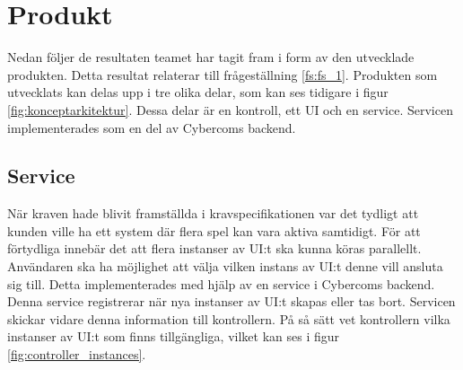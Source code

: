 \section{Produkt}
Nedan följer de resultaten teamet har tagit fram i form av den utvecklade produkten. Detta resultat relaterar till frågeställning \ref{fs:fs_1}. Produkten som utvecklats kan delas upp i tre olika delar, som kan ses tidigare i figur \ref{fig:konceptarkitektur}. Dessa delar är en kontroll, ett UI och en service. Servicen implementerades som en del av Cybercoms backend.

\subsection{Service}
När kraven hade blivit framställda i kravspecifikationen var det tydligt att kunden ville ha ett system där flera spel kan vara aktiva samtidigt. För att förtydliga innebär det att flera instanser av UI:t ska kunna köras parallellt. Användaren ska ha möjlighet att välja vilken instans av UI:t denne vill ansluta sig till. Detta implementerades med hjälp av en service i Cybercoms backend. Denna service registrerar när nya instanser av UI:t skapas eller tas bort. Servicen skickar vidare denna information till kontrollern. På så sätt vet kontrollern vilka instanser av UI:t som finns tillgängliga, vilket kan ses i figur \ref{fig:controller_instances}.

